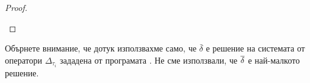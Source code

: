 \begin{proof}
\begin{itemize}
  \end{itemize}
\end{proof}

Обърнете внимание, че дотук използвахме само, че $\bar{\delta}$ е решение на системата от оператори $\Delta_{\tau_i}$ зададена от програмата . 
Не сме използвали, че $\overline{\delta}$ е най-малкото решение.

